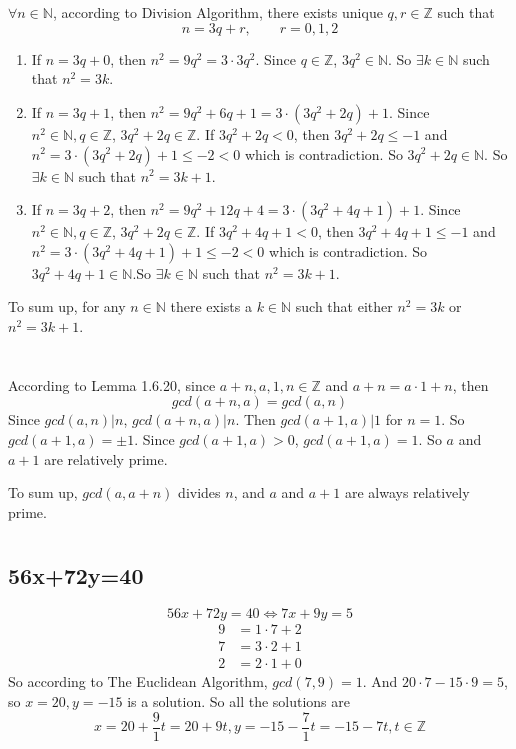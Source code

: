 \documentclass[a4paper,12pt,titlepage]{article}
\begin{document}
\section{}
$\forall n\in\mathbb{N}$, according to Division Algorithm, there exists unique $q,r\in\mathbb{Z}$ such that
$$n=3q+r,\,\,\,\,\,\,\,\,\,\,\,\,r=0,1,2$$
\begin{enumerate}
\item If $n=3q+0$, then $n^2=9q^2=3\cdot 3q^2$. Since $q\in\mathbb{Z}$, $3q^2\in \mathbb{N}$. So $\exists k\in\mathbb{N}$ such that $n^2=3k$.
\item If $n=3q+1$, then $n^2=9q^2+6q+1=3\cdot (3q^2+2q)+1$. Since $n^2\in\mathbb{N},q\in\mathbb{Z}$, $3q^2+2q\in \mathbb{Z}$. If $3q^2+2q<0$, then $3q^2+2q\leqslant-1$ and $n^2=3\cdot(3q^2+2q)+1\leqslant-2<0$ which is contradiction. So $3q^2+2q\in\mathbb{N}$. So $\exists k\in\mathbb{N}$ such that $n^2=3k+1$.
\item If $n=3q+2$, then $n^2=9q^2+12q+4=3\cdot (3q^2+4q+1)+1$. Since $n^2\in\mathbb{N},q\in\mathbb{Z}$, $3q^2+2q\in \mathbb{Z}$. If $3q^2+4q+1<0$, then $3q^2+4q+1\leqslant-1$ and $n^2=3\cdot(3q^2+4q+1)+1\leqslant-2<0$ which is contradiction. So $3q^2+4q+1\in\mathbb{N}$.So $\exists k\in\mathbb{N}$ such that $n^2=3k+1$.

\end{enumerate}

To sum up, for any $n \in \mathbb{N}$ there exists a $k \in \mathbb{N}$ such that either $n^2 = 3k$ or $n^2 = 3k + 1$.

\section{}
According to Lemma 1.6.20, since $a+n,a,1,n\in\mathbb{Z}$ and $a+n=a\cdot 1+n$, then
$$gcd(a+n,a)=gcd(a,n)$$
Since $gcd(a,n)|n$, $gcd(a+n,a)|n$. Then $gcd(a+1,a)|1$ for $n=1$. So $gcd(a+1,a)=\pm 1 $. Since $gcd(a+1,a)>0$, $gcd(a+1,a)=1$. So $a$ and $a+1$ are relatively prime.

To sum up, $gcd(a, a + n)$ divides $n$, and $a$ and $a + 1$ are always relatively prime. 

\section{}
\subsection{56x+72y=40}
$$56x+72y=40\Leftrightarrow 7x+9y=5$$
\begin{align*}
9&=1\cdot7+2\\
7&=3\cdot2+1\\
2&=2\cdot1+0
\end{align*}
So according to The Euclidean Algorithm,  $gcd(7,9)=1$. And $20\cdot7-15\cdot9=5$, so $x=20,y=-15$ is a solution. So all the solutions are
$$x=20+\dfrac{9}{1}t=20+9t,y=-15-\dfrac{7}{1}t=-15-7t,t\in\mathbb{Z}$$
\end{document}
